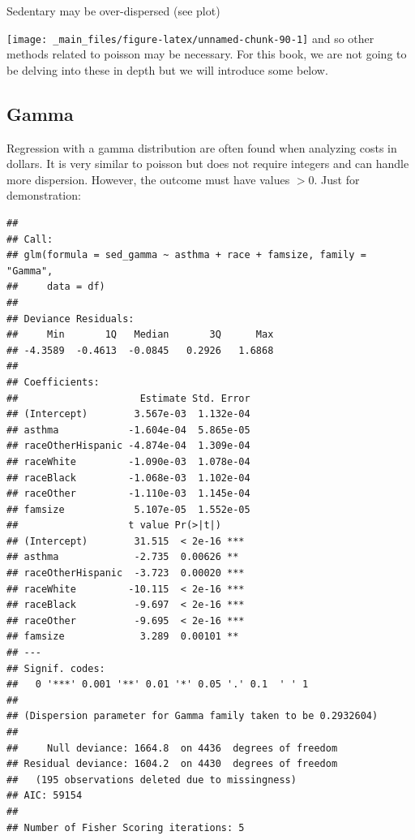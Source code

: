 \documentclass[]{tufte-book}
\newenvironment{Shaded}{}{}
\newcommand{\KeywordTok}[1]{\textcolor[rgb]{0.00,0.44,0.13}{\textbf{#1}}}
\newcommand{\DataTypeTok}[1]{\textcolor[rgb]{0.56,0.13,0.00}{#1}}
\newcommand{\FloatTok}[1]{\textcolor[rgb]{0.25,0.63,0.44}{#1}}
\newcommand{\StringTok}[1]{\textcolor[rgb]{0.25,0.44,0.63}{#1}}
\newcommand{\OperatorTok}[1]{\textcolor[rgb]{0.40,0.40,0.40}{#1}}
\newcommand{\NormalTok}[1]{#1}
\theoremstyle{definition}
\theoremstyle{definition}
\theoremstyle{remark}
\begin{document}
Sedentary may be over-dispersed (see plot)

\texttt{[image: \_main\_files/figure-latex/unnamed-chunk-90-1]} and so
other methods related to poisson may be necessary. For this book, we are
not going to be delving into these in depth but we will introduce some
below.

\subsection*{Gamma}\label{gamma}

Regression with a gamma distribution are often found when analyzing
costs in dollars. It is very similar to poisson but does not require
integers and can handle more dispersion. However, the outcome must have
values \(> 0\). Just for demonstration:

\begin{Shaded}
\end{Shaded}

\begin{verbatim}
## 
## Call:
## glm(formula = sed_gamma ~ asthma + race + famsize, family = "Gamma", 
##     data = df)
## 
## Deviance Residuals: 
##     Min       1Q   Median       3Q      Max  
## -4.3589  -0.4613  -0.0845   0.2926   1.6868  
## 
## Coefficients:
##                     Estimate Std. Error
## (Intercept)        3.567e-03  1.132e-04
## asthma            -1.604e-04  5.865e-05
## raceOtherHispanic -4.874e-04  1.309e-04
## raceWhite         -1.090e-03  1.078e-04
## raceBlack         -1.068e-03  1.102e-04
## raceOther         -1.110e-03  1.145e-04
## famsize            5.107e-05  1.552e-05
##                   t value Pr(>|t|)    
## (Intercept)        31.515  < 2e-16 ***
## asthma             -2.735  0.00626 ** 
## raceOtherHispanic  -3.723  0.00020 ***
## raceWhite         -10.115  < 2e-16 ***
## raceBlack          -9.697  < 2e-16 ***
## raceOther          -9.695  < 2e-16 ***
## famsize             3.289  0.00101 ** 
## ---
## Signif. codes:  
##   0 '***' 0.001 '**' 0.01 '*' 0.05 '.' 0.1  ' ' 1
## 
## (Dispersion parameter for Gamma family taken to be 0.2932604)
## 
##     Null deviance: 1664.8  on 4436  degrees of freedom
## Residual deviance: 1604.2  on 4430  degrees of freedom
##   (195 observations deleted due to missingness)
## AIC: 59154
## 
## Number of Fisher Scoring iterations: 5
\end{verbatim}
\end{document}
